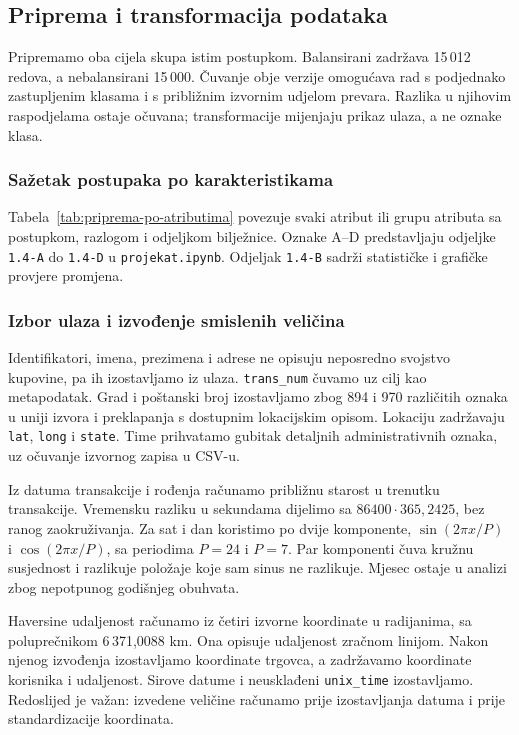 \clearpage
\subsection{Priprema i transformacija podataka}\label{sec:priprema}
Pripremamo oba cijela skupa istim postupkom. Balansirani zadržava 15\,012 redova,
a nebalansirani 15\,000. Čuvanje obje verzije omogućava rad s podjednako
zastupljenim klasama i s približnim izvornim udjelom prevara. Razlika u njihovim
raspodjelama ostaje očuvana; transformacije mijenjaju prikaz ulaza, a ne oznake klasa.

\subsubsection*{Sažetak postupaka po karakteristikama}
Tabela~\ref{tab:priprema-po-atributima} povezuje svaki atribut ili grupu atributa
sa postupkom, razlogom i odjeljkom bilježnice. Oznake A--D predstavljaju odjeljke
\texttt{1.4-A} do \texttt{1.4-D} u \texttt{projekat.ipynb}. Odjeljak
\texttt{1.4-B} sadrži statističke i grafičke provjere promjena.


\subsubsection*{Izbor ulaza i izvođenje smislenih veličina}
Identifikatori, imena, prezimena i adrese ne opisuju neposredno svojstvo kupovine,
pa ih izostavljamo iz ulaza. \texttt{trans\_num} čuvamo uz cilj kao metapodatak.
Grad i poštanski broj izostavljamo zbog 894 i 970 različitih oznaka u uniji
izvora i preklapanja s dostupnim lokacijskim opisom. Lokaciju zadržavaju
\texttt{lat}, \texttt{long} i \texttt{state}. Time prihvatamo gubitak detaljnih
administrativnih oznaka, uz očuvanje izvornog zapisa u CSV-u.

Iz datuma transakcije i rođenja računamo približnu starost u trenutku transakcije.
Vremensku razliku u sekundama dijelimo sa $86400\cdot365{,}2425$, bez ranog
zaokruživanja. Za sat i dan koristimo po dvije komponente,
$\sin(2\pi x/P)$ i $\cos(2\pi x/P)$, sa periodima $P=24$ i $P=7$.
Par komponenti čuva kružnu susjednost i razlikuje položaje koje sam sinus ne razlikuje.
Mjesec ostaje u analizi zbog nepotpunog godišnjeg obuhvata.

Haversine udaljenost računamo iz četiri izvorne koordinate u radijanima,
sa poluprečnikom 6\,371,0088 km. Ona opisuje udaljenost zračnom linijom.
Nakon njenog izvođenja izostavljamo koordinate trgovca, a zadržavamo koordinate
korisnika i udaljenost. Sirove datume i neusklađeni \texttt{unix\_time} izostavljamo.
Redoslijed je važan: izvedene veličine računamo prije izostavljanja datuma
i prije standardizacije koordinata.

